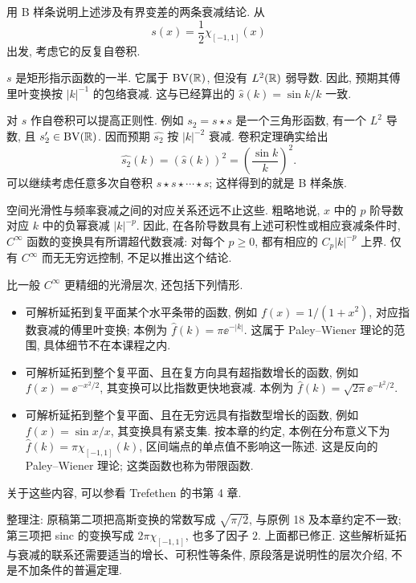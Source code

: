 \begin{example}\label{ex:b-splines}
用 B 样条说明上述涉及有界变差的两条衰减结论. 从
\[
s(x)=\frac12\chi_{[-1,1]}(x)
\]
出发, 考虑它的反复自卷积.
\end{example}
\begin{solution}
$s$ 是矩形指示函数的一半. 它属于 $\operatorname{BV}(\mathbb R)$, 但没有 $L^2(\mathbb R)$ 弱导数. 因此, 预期其傅里叶变换按 $|k|^{-1}$ 的包络衰减. 这与已经算出的 $\widehat s(k)=\sin k/k$ 一致.

对 $s$ 作自卷积可以提高正则性. 例如 $s_2=s\star s$ 是一个三角形函数, 有一个 $L^2$ 导数, 且 $s_2'\in\operatorname{BV}(\mathbb R)$. 因而预期 $\widehat{s_2}$ 按 $|k|^{-2}$ 衰减. 卷积定理确实给出
\[
\widehat{s_2}(k)=(\widehat s(k))^2=\left(\frac{\sin k}{k}\right)^2.
\]
可以继续考虑任意多次自卷积 $s\star s\star\cdots\star s$; 这样得到的就是 B 样条族.
\end{solution}

空间光滑性与频率衰减之间的对应关系还远不止这些. 粗略地说, $x$ 中的 $p$ 阶导数对应 $k$ 中的负幂衰减 $|k|^{-p}$. 因此, 在各阶导数具有上述可积性或相应衰减条件时, $C^\infty$ 函数的变换具有所谓超代数衰减: 对每个 $p\ge0$, 都有相应的 $C_p|k|^{-p}$ 上界. 仅有 $C^\infty$ 而无无穷远控制, 不足以推出这个结论.

比一般 $C^\infty$ 更精细的光滑层次, 还包括下列情形.
\begin{itemize}
\item 可解析延拓到复平面某个水平条带的函数, 例如 $f(x)=1/(1+x^2)$, 对应指数衰减的傅里叶变换; 本例为 $\widehat f(k)=\pi\ee^{-|k|}$. 这属于 Paley--Wiener 理论的范围, 具体细节不在本课程之内.
\item 可解析延拓到整个复平面、且在复方向具有超指数增长的函数, 例如 $f(x)=\ee^{-x^2/2}$, 其变换可以比指数更快地衰减. 本例为 $\widehat f(k)=\sqrt{2\pi}\ee^{-k^2/2}$.
\item 可解析延拓到整个复平面、且在无穷远具有指数型增长的函数, 例如 $f(x)=\sin x/x$, 其变换具有紧支集. 按本章的约定, 本例在分布意义下为 $\widehat f(k)=\pi\chi_{[-1,1]}(k)$, 区间端点的单点值不影响这一陈述. 这是反向的 Paley--Wiener 理论; 这类函数也称为带限函数.
\end{itemize}
关于这些内容, 可以参看 Trefethen 的书第 4 章.
\begin{remark}
整理注: 原稿第二项把高斯变换的常数写成 $\sqrt{\pi/2}$, 与原例 18 及本章约定不一致; 第三项把 sinc 的变换写成 $2\pi\chi_{[-1,1]}$, 也多了因子 $2$. 上面都已修正. 这些解析延拓与衰减的联系还需要适当的增长、可积性等条件, 原段落是说明性的层次介绍, 不是不加条件的普遍定理.
\end{remark}

